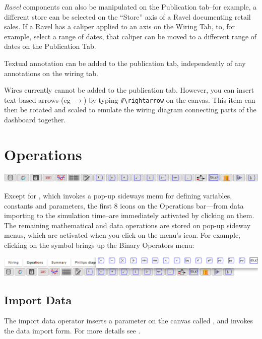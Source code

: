 \emph{Ravel} components can also be manipulated on the Publication
tab--for example, a different store can be selected on the ``Store''
axis of a Ravel documenting retail sales. If a Ravel has a caliper
applied to an axis on the Wiring Tab, to, for example, select a range
of dates, that caliper can be moved to a different range of dates
on the Publication Tab.

Textual annotation can be added to the publication tab, independently
of any annotations on the wiring tab.

Wires currently cannot be added to the publication tab. However, you
can insert text-based arrows (eg $\rightarrow$) by typing \verb+#\rightarrow+
on the canvas. This item can then be rotated and scaled to emulate the wiring
diagram connecting parts of the dashboard together.

\section{Operations}

\label{Operations}

\noindent\includegraphics[width=\textwidth]{images/DesignIcons}

Except for , which invokes a pop-up sideways
menu for defining variables, constants and parameters, the first 8
icons on the Operations bar---from data importing to the simulation
time--are immediately activated by clicking on them. The remaining
mathematical and data operations are stored on pop-up sideway menus,
which are activated when you click on the menu's icon. For example,
clicking on the  symbol brings up the
Binary Operators menu:

\noindent\includegraphics[width=\textwidth]{images/DesignIconsWithBinaryOperatorsMenu}

\subsection{Import Data}

The import data operator  inserts
a parameter on the canvas called ,
and invokes the data import form. For more details see .

